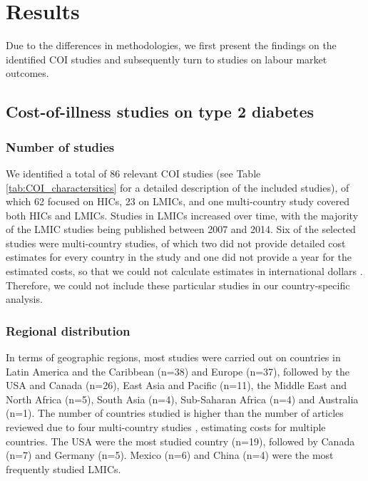 \section{Results}
Due to the differences in methodologies, we first present the findings on the identified \ac{COI} studies and subsequently turn to studies on labour market outcomes.

\subsection{Cost-of-illness studies on type 2 diabetes}

\subsubsection{Number of studies}
We identified a total of 86 relevant \ac{COI} studies (see Table \ref{tab:COI_charactersitics} for a detailed description of the included studies), of which 62 focused on \acp{HIC}, 23 on \acp{LMIC}, and one multi-country study covered both \acp{HIC} and \acp{LMIC}. Studies in \acp{LMIC} increased over time, with the majority of the \ac{LMIC} studies being published between 2007 and 2014. Six of the selected studies were multi-country studies, of which two \parencite{Kirigia2009,Smith-Spangler2012} did not provide detailed cost estimates for every country in the study and one did not provide a year for the estimated costs, so that we could not calculate estimates in international dollars \parencite{Boutayeb2014}. Therefore, we could not include these particular studies in our country-specific analysis.

\subsubsection{Regional distribution}
In terms of geographic regions, most studies were carried out on countries in Latin America and the Caribbean (n=38) and Europe (n=37), followed by the USA and Canada (n=26), East Asia and Pacific (n=11), the Middle East and North Africa (n=5), South Asia (n=4), Sub-Saharan Africa (n=4) and Australia (n=1). The number of countries studied is higher than the number of articles reviewed due to four multi-country studies \parencite{Boutayeb2014,Barcelo2003,Jonsson2002b,Abdulkadri2009b}, estimating costs for multiple countries. The USA were the most studied country (n=19), followed by Canada (n=7) and Germany (n=5). Mexico (n=6) and China (n=4) were the most frequently studied \acp{LMIC}.

